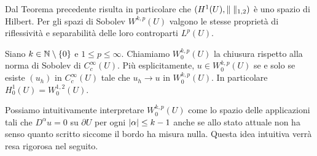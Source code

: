 Dal Teorema precedente risulta in particolare che $(H^{1}(U), \lVert\;\rVert_{1,2})$ è uno spazio di Hilbert. Per gli spazi di Sobolev $W^{k,p}(U)$ valgono le stesse proprietà di riflessività e separabilità delle loro controparti $L^p(U)$.
\begin{definizione}
	Siano $k \in \mathbb{N}\setminus\left\lbrace 0\right\rbrace $ e $1\le p \le \infty$. Chiamiamo $W^{k,p}_{0}(U)$ la chiusura rispetto alla norma di Sobolev di $C^\infty_c(U)$. Più esplicitamente, $u \in W^{k,p}_{0}(U)$ se e solo se esiste $(u_h)$ in $C^\infty_c(U)$ tale che $u_h \to u$ in $ W^{k,p}_{0}(U)$. In particolare $H^{1}_0(U) = W^{1,2}_{0}(U)$.
\end{definizione}
Possiamo intuitivamente interpretare $ W^{k,p}_{0}(U)$ come lo spazio delle applicazioni tali che $D^\alpha u = 0$ su $\partial U$ per ogni $\lvert\alpha\rvert \le k-1$ anche se allo stato attuale non ha senso quanto scritto siccome il bordo ha misura nulla. Questa idea intuitiva verrà resa rigorosa nel seguito.

